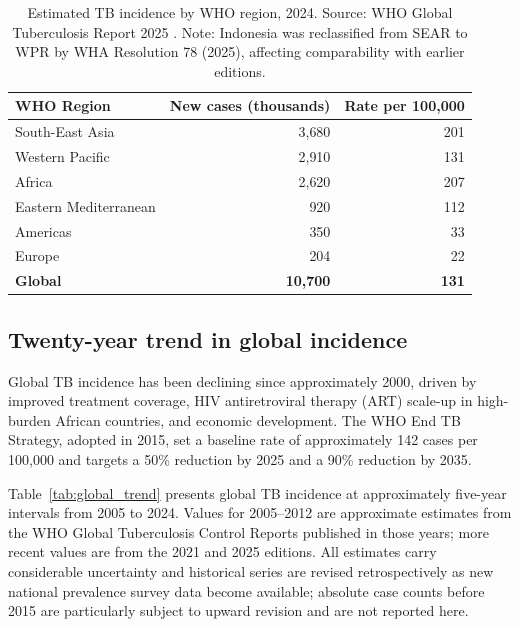 \documentclass[11pt]{article}
\begin{document}
\begin{table}[h]
\centering
\caption{Estimated TB incidence by WHO region, 2024. Source: WHO Global Tuberculosis Report 2025 \citep{who2025global}. Note: Indonesia was reclassified from SEAR to WPR by WHA Resolution 78 (2025), affecting comparability with earlier editions.}
\label{tab:who_region_2024}
\begin{tabular}{lrr}
\toprule
\textbf{WHO Region} & \textbf{New cases (thousands)} & \textbf{Rate per 100{,}000} \\
\midrule
South-East Asia    & 3{,}680 & 201 \\
Western Pacific    & 2{,}910 & 131 \\
Africa             & 2{,}620 & 207 \\
Eastern Mediterranean & 920  & 112 \\
Americas           &   350  &  33 \\
Europe             &   204  &  22 \\
\midrule
\textbf{Global}    & \textbf{10{,}700} & \textbf{131} \\
\bottomrule
\end{tabular}
\end{table}

\subsection{Twenty-year trend in global incidence}

Global TB incidence has been declining since approximately 2000, driven by improved treatment coverage, HIV antiretroviral therapy (ART) scale-up in high-burden African countries, and economic development. The WHO End TB Strategy, adopted in 2015, set a baseline rate of approximately 142 cases per 100{,}000 and targets a 50\% reduction by 2025 and a 90\% reduction by 2035.

Table~\ref{tab:global_trend} presents global TB incidence at approximately five-year intervals from 2005 to 2024. Values for 2005--2012 are approximate estimates from the WHO Global Tuberculosis Control Reports published in those years; more recent values are from the 2021 and 2025 editions. All estimates carry considerable uncertainty and historical series are revised retrospectively as new national prevalence survey data become available; absolute case counts before 2015 are particularly subject to upward revision and are not reported here.
\end{document}
